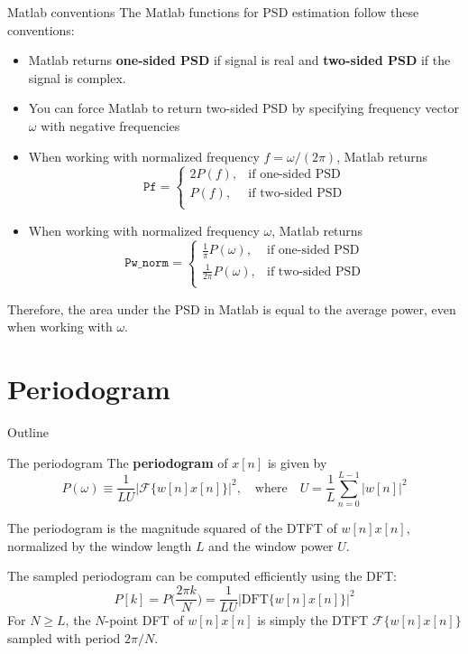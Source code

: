 \documentclass[10pt]{beamer}
\begin{document}
%
\begin{frame}{Matlab conventions}
The Matlab functions for PSD estimation follow these conventions:
\begin{itemize}
	\item Matlab returns \textbf{one-sided PSD} if signal is real and \textbf{two-sided PSD} if the signal is complex.
	\item You can force Matlab to return two-sided PSD by specifying frequency vector $\omega$ with negative frequencies
	\item When working with normalized frequency $f = \omega/(2\pi)$, Matlab returns 
	\begin{equation*}
		\texttt{Pf} = \begin{cases}
		2P(f), &\text{if one-sided PSD} \\
		P(f), &\text{if two-sided PSD} \\
		\end{cases}
	\end{equation*}
	\item When working with normalized frequency $\omega$, Matlab returns 	
	\begin{equation*}
	\texttt{Pw\_norm} = \displaystyle\begin{cases}
		\displaystyle\frac{1}{\pi}P(\omega), &\text{if one-sided PSD} \\
		\displaystyle\frac{1}{2\pi}P(\omega), &\text{if two-sided PSD} \\
	\end{cases}
	\end{equation*}
\end{itemize}
Therefore, the area under the PSD in Matlab is equal to the average power, even when working with $\omega$.
\end{frame}

%
\section{Periodogram}
\begin{frame}{Outline}
	\tableofcontents[currentsection]
\end{frame}
\begin{frame}{The periodogram}
	The \textbf{periodogram} of $x[n]$ is given by
	\begin{equation*}
		P(\omega) \equiv \frac{1}{LU}|\mathcal{F}\{w[n]x[n]\}|^2, \quad\text{where}\quad U = \frac{1}{L}\sum_{n = 0}^{L-1}|w[n]|^2
	\end{equation*}
	
	The periodogram is the magnitude squared of the DTFT of $w[n]x[n]$, normalized by the window length $L$ and the window power $U$.
	
	\vspace{0.25cm}
	The sampled periodogram can be computed efficiently using the DFT:
	\begin{equation*}
		P[k] = P\Big(\frac{2\pi k}{N}\Big) = \frac{1}{LU}|\mathrm{DFT}\{w[n]x[n]\}|^2
	\end{equation*}
	For $N \geq L$, the $N$-point DFT of $w[n]x[n]$ is simply the DTFT $\mathcal{F}\{w[n]x[n]\}$ sampled with period $2\pi/N$.
\end{frame}
\end{document}
